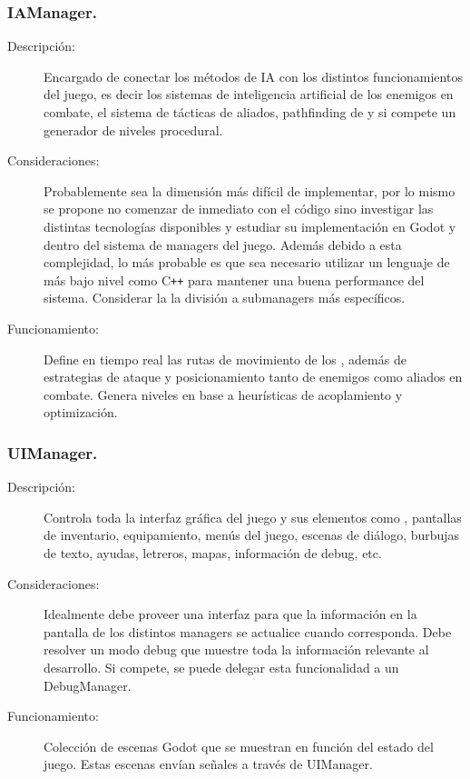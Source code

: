 \subsubsection{IAManager.}\label{modelado:iamanager}
\begin{description}
	\item[Descripción:] Encargado de conectar los métodos de IA con los distintos funcionamientos del juego, es decir los sistemas de inteligencia artificial de los enemigos en combate, el sistema de tácticas de aliados, pathfinding de  y si compete un generador de niveles procedural. 
	
	\item[Consideraciones:] Probablemente sea la dimensión más difícil de implementar, por lo mismo se propone no comenzar de inmediato con el código sino investigar las distintas tecnologías disponibles y estudiar su implementación en Godot y dentro del sistema de managers del juego. Además debido a esta complejidad, lo más probable es que sea necesario utilizar un lenguaje de más bajo nivel como C\texttt{++} para mantener una buena performance del sistema. Considerar la la división a submanagers más específicos.
	
	\item[Funcionamiento:] Define en tiempo real las rutas de movimiento de los , además de estrategias de ataque y posicionamiento tanto de enemigos como aliados en combate. Genera niveles en base a heurísticas de acoplamiento y optimización.
\end{description}
	
\subsubsection{UIManager.}\label{modelado:uimanager}
	\begin{description}
	\item[Descripción:] Controla toda la interfaz gráfica del juego y sus elementos como , pantallas de inventario, equipamiento, menús del juego, escenas de diálogo, burbujas de texto, ayudas, letreros, mapas, información de debug, etc.
	
	\item[Consideraciones:] Idealmente debe proveer una interfaz para que la información en la pantalla de los distintos managers se actualice cuando corresponda. Debe resolver un modo debug que muestre toda la información relevante al desarrollo. Si compete, se puede delegar esta funcionalidad a un DebugManager.
	
	\item[Funcionamiento:] Colección de escenas Godot que se muestran en función del estado del juego. Estas escenas envían señales a través de UIManager.
\end{description}
	
